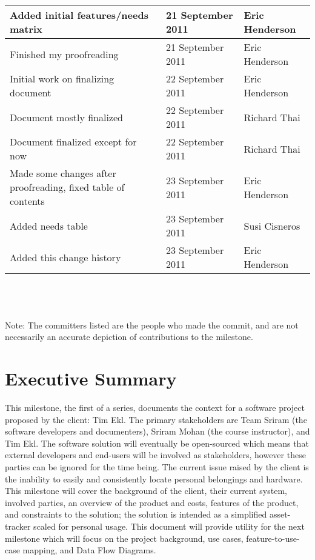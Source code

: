 \documentclass{article}
\begin{document}
\begin{tabular}{ | p{3.75in} | p{1.5in} | p{1.25in} | }
\hline
Added initial features/needs matrix & 21 September 2011 & Eric Henderson\\
\hline
Finished my proofreading & 21 September 2011 & Eric Henderson\\
\hline
Initial work on finalizing document & 22 September 2011 & Eric Henderson\\
\hline
Document mostly finalized & 22 September 2011 & Richard Thai\\
\hline
Document finalized except for now & 22 September 2011 & Richard Thai\\
\hline
Made some changes after proofreading, fixed table of contents & 23 September 2011 & Eric Henderson\\
\hline
Added needs table & 23 September 2011 & Susi Cisneros\\
\hline
Added this change history & 23 September 2011 & Eric Henderson\\
\hline
\end{tabular}\\
~\\
~\\
Note: The committers listed are the people who made the commit, and are not necessarily an accurate depiction of contributions to the milestone.
\clearpage
\section{Executive Summary}
This milestone, the first of a series, documents the context for a software project proposed by the client: Tim Ekl. The primary stakeholders are Team Sriram (the software developers and documenters), Sriram Mohan (the course instructor), and Tim Ekl.  The software solution will eventually be open-sourced which means that external developers and end-users will be involved as stakeholders, however these parties can be ignored for the time being. The current issue raised by the client is the inability to easily and consistently locate personal belongings and hardware. This milestone will cover the background of the client, their current system, involved parties, an overview of the product and costs, features of the product, and constraints to the solution; the solution is intended as a simplified asset-tracker scaled for personal usage. This document will provide utility for the next milestone which will focus on the project background, use cases, feature-to-use-case mapping, and Data Flow Diagrams.
\end{document}

